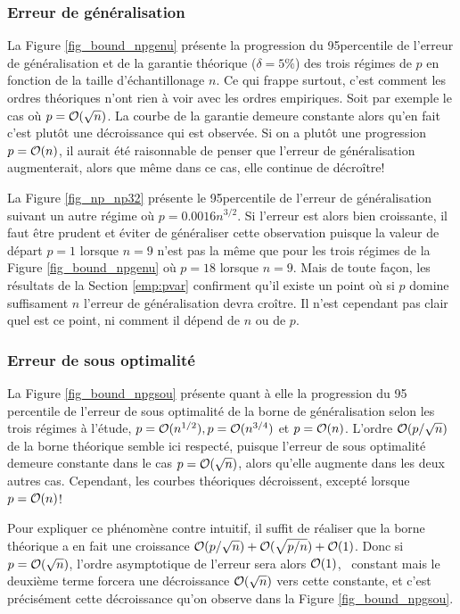 \subsubsection{Erreur de généralisation}


La Figure \ref{fig_bound_npgenu} présente la progression du 95\ieme percentile de l'erreur
de généralisation et de la garantie théorique ($\delta = 5\%$) des trois régimes de $p$ en
fonction de la taille d'échantillonage $n$. Ce qui frappe surtout, c'est comment les
ordres théoriques n'ont rien à voir avec les ordres empiriques. Soit par exemple le cas où
$p=\mathcal O(\sqrt{n})$. La courbe de la garantie demeure constante alors qu'en fait c'est
plutôt une décroissance qui est observée. Si on a plutôt une progression $p=\mathcal O(n)$, il
aurait été raisonnable de penser que l'erreur de généralisation augmenterait, alors que
même dans ce cas, elle continue de décroître!

La Figure \ref{fig_np_np32} présente le 95\ieme percentile de l'erreur de généralisation
suivant un autre régime où $p=0.0016n^{3/2}$. Si l'erreur est alors bien croissante, il
faut être prudent et éviter de généraliser cette observation puisque la valeur de départ
$p = 1$ lorsque $n=9$ n'est pas la même que pour les trois régimes de la Figure
\ref{fig_bound_npgenu} où $p=18$ lorsque $n=9$. Mais de toute façon, les résultats de la
Section \ref{emp:pvar} confirment qu'il existe un point où si $p$ domine suffisament $n$
l'erreur de généralisation devra croître. Il n'est cependant pas clair quel est ce point,
ni comment il dépend de $n$ ou de $p$.


\subsubsection{Erreur de sous optimalité}

La Figure \ref{fig_bound_npgsou} présente quant à elle la progression du 95\ieme
percentile de l'erreur de sous optimalité de la borne de généralisation selon les trois
régimes à l'étude, $p=\mathcal O(n^{1/2}),p=\mathcal O(n^{3/4})$ et $p=\mathcal O(n)$. L'ordre
$\mathcal O(p/\sqrt{n})$ de la borne théorique semble ici respecté, puisque l'erreur de sous
optimalité demeure constante dans le cas $p=\mathcal O(\sqrt{n})$, alors qu'elle augmente dans
les deux autres cas. Cependant, les courbes théoriques décroissent, excepté lorsque
$p=\mathcal O(n)$!

Pour expliquer ce phénomène contre intuitif, il suffit de réaliser que la borne théorique
a en fait une croissance $\mathcal O(p/\sqrt{n}) + \mathcal O(\sqrt{p/n}) + \mathcal O(1)$. Donc si
$p=\mathcal O(\sqrt{n})$, l'ordre asymptotique de l'erreur sera alors $\mathcal O(1)$, \ie\ constant
mais le deuxième terme forcera une décroissance $\mathcal O(\sqrt{n})$ vers cette constante, et
c'est précisément cette décroissance qu'on observe dans la Figure \ref{fig_bound_npgsou}.

